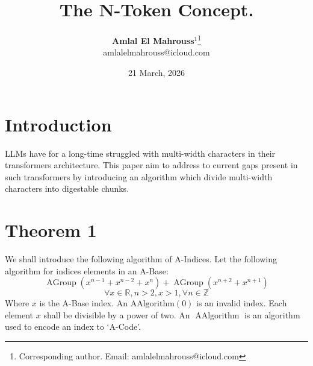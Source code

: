 \documentclass[10pt, twocolumn]{article}
\title{%
  \vspace{-1.5em}%
  \large\textbf{The N-Token Concept.}%
}
\author{%
  \textbf{Amlal El Mahrouss}$^{1}$\thanks{Corresponding author. Email: amlalelmahrouss@icloud.com}
  \\amlalelmahrouss@icloud.com\\[0.4em]
}
\date{%
  \small 21 March, 2026
}
\theoremstyle{plain}
\theoremstyle{definition}
\theoremstyle{remark}
\begin{document}

\twocolumn[{%
  \maketitle
  \vspace{-0.5em}
  \rule{\linewidth}{0.4pt}
  \begin{center}
  \begin{minipage}{0.92\linewidth}
    \small
    \textbf{Abstract.}\enspace
    This development paper presents an algorithm which expresses characters, 'A', 'B', 'Z' as single tokens. Each character has an index chosen by two parties, e.g: A=428, B=422.

    \medskip
    \textbf{Keywords:}\enspace
    Computer Science; Software Engineering;
  \end{minipage}
  \end{center}
  \vspace{0.8em}
  \rule{\linewidth}{0.4pt}
  \vspace{1em}
}]

\section{Introduction}
\label{sec:acode-introduction}

LLMs have for a long-time struggled with multi-width characters in their transformers architecture. This paper aim to address to current gaps present in such transformers by introducing an algorithm which divide multi-width characters into digestable chunks. 

\section{Theorem 1}
\label{sec:acode-theorem01}

We shall introduce the following algorithm of A-Indices.
Let the following algorithm for indices elements in an A-Base:
\begin{equation}
    \operatorname{AGroup}(x^{n-1}+x^{n-2}+x^{n})+\operatorname{AGroup}(x^{n+2}+x^{n+1})
\end{equation}
\begin{equation}
    \forall x \in \mathbb{R}, n > 2, x > 1, \forall n \in \mathbb{Z}
\end{equation}
Where $x$ is the A-Base index. An $\operatorname{AAlgorithm(0)}$ is an invalid index. Each element $x$ shall be divisible by a power of two. An $\operatorname{AAlgorithm}$ is an algorithm used to encode an index to `A-Code'.
\end{document}
